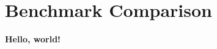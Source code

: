 \documentclass[../main.tex]{subfiles}
\begin{document}
    
\chapter{Benchmark Comparison}
    
\textbf{Hello, world!}
\end{document}

